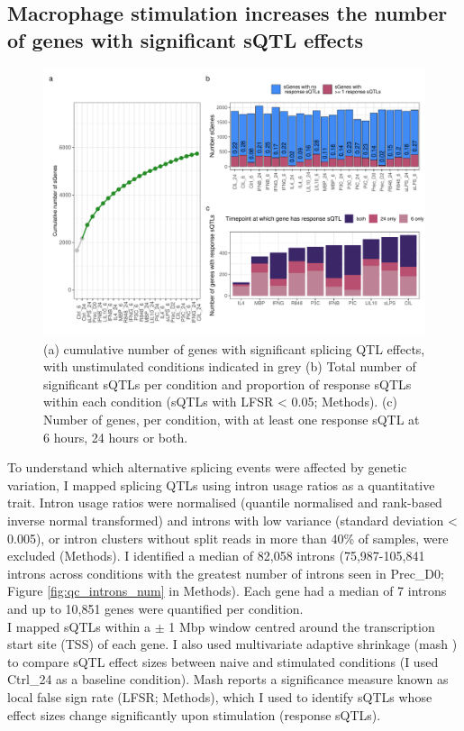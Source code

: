 \subsection{Macrophage stimulation increases the number of genes with significant sQTL effects }
\begin{figure}[H]
  \centering
  \includegraphics[width=\textwidth]{sqtl}
  \caption{(a) cumulative number of genes with significant splicing QTL effects, with unstimulated conditions indicated in grey (b) Total number of significant sQTLs per condition and proportion of response sQTLs within each condition (sQTLs with LFSR < 0.05; Methods). (c) Number of genes, per condition, with at least one response sQTL at 6 hours, 24 hours or both.}
  \label{fig:sqtl}   
\end{figure}
To understand which alternative splicing events were affected by genetic variation, I mapped splicing QTLs using intron usage ratios as a quantitative trait. Intron usage ratios were normalised (quantile normalised and rank-based inverse normal transformed) and introns with low variance (standard deviation < 0.005), or intron clusters without split reads in more than 40\% of samples, were excluded (Methods). I identified a median of 82,058 introns (75,987-105,841 introns across conditions with the greatest  number of introns seen in Prec\_D0; Figure \ref{fig:qc_introns_num} in Methods). Each gene had a median of 7 introns and up to 10,851 genes were quantified per condition. \\

I mapped sQTLs within a $\pm$ 1 Mbp window centred around the transcription start site (TSS) of each gene. I also used multivariate adaptive shrinkage (mash \cite{Urbut2019-gf}) to compare sQTL effect sizes between naive and stimulated conditions (I used Ctrl\_24 as a baseline condition). Mash reports a significance measure known as local false sign rate (LFSR; Methods), which I used to identify sQTLs whose effect sizes change significantly upon stimulation (response sQTLs). \\


